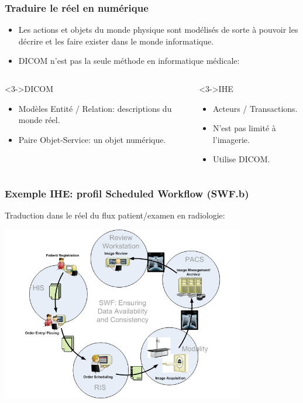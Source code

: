 
	\frame
	{
		\frametitle{Traduire le r\'eel en num\'erique}
		\begin{itemize}
			\item Les actions et objets du monde physique sont mod\'elis\'es de sorte \`a pouvoir les d\'ecrire et les faire exister dans le monde informatique.
			\item<2-> DICOM n'est pas la seule m\'ethode en informatique m\'edicale:
		\end{itemize}
		\begin{columns}
			\begin{column}{0.45\textwidth}
				\begin{block}<3->{DICOM}
					\begin{itemize}
						\item<4-> Mod\`eles Entit\'e / Relation: descriptions du monde r\'eel.
						\item<5-> Paire Objet-Service: un objet num\'erique.
					\end{itemize}
				\end{block}
			\end{column}
			\begin{column}{0.45\textwidth}
				\begin{block}<3->{IHE}
					\begin{itemize}
						\item<4-> Acteurs / Transactions.
						\item<6-> N'est pas limit\'e \`a l'imagerie.
						\item<7> Utilise DICOM.
					\end{itemize}
				\end{block}
			\end{column}
		\end{columns}
	}

	\frame
	{
		\frametitle{Exemple IHE: profil Scheduled Workflow (SWF.b)}
		Traduction dans le r\'eel du flux patient/examen en radiologie:
		\begin{center}
			\includegraphics[width=0.8\textwidth]{../figures/SwfB-v4.png}
		\end{center}
	}


